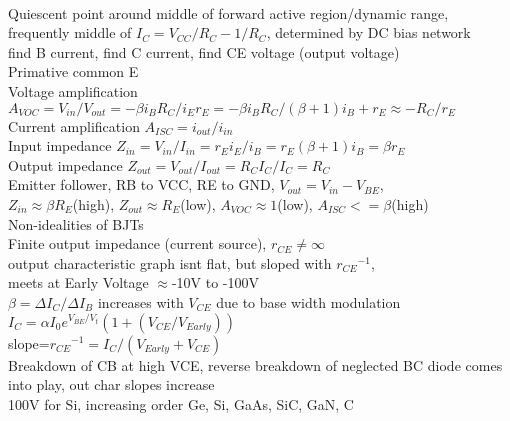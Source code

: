\documentclass{article}
\begin{document}
\begin{large}
\\Quiescent point around middle of forward active region/dynamic range, 
\\frequently middle of $I_C=V_{CC}/R_C-1/R_C$, determined by DC bias network
\\find B current, find C current, find CE voltage (output voltage)
\\Primative common E
\\Voltage amplification $A_{VOC}=V_{in}/V_{out}=-\beta i_B R_C / i_E r_E = -\beta i_B R_C / (\beta+1)i_B+r_E\approx -R_C/r_E$
\\Current amplification $A_{ISC}=i_{out}/i_{in}$
\\Input impedance $Z_{in}=V_{in}/I_{in}=r_Ei_E/i_B=r_E(\beta+1)i_B=\beta r_E$
\\Output impedance $Z_{out}=V_{out}/I_{out}=R_CI_C/I_C=R_C$
\\Emitter follower, RB to VCC, RE to GND, $V_{out}=V_{in}-V_{BE}$, 
\\$Z_{in}\approx\beta R_E$(high), $Z_{out}\approx R_E$(low), $A_{VOC}\approx 1$(low), $A_{ISC}<=\beta$(high)
\\Non-idealities of BJTs
\\Finite output impedance (current source), $r_{CE}\neq\infty$
\\output characteristic graph isnt flat, but sloped with $r_{CE}$$^{-1}$, 
\\meets at Early Voltage $\approx$-10V to -100V
\\$\beta=\Delta I_C/\Delta I_B$ increases with $V_{CE}$ due to base width modulation
\\$I_C=\alpha I_0 e^{V_{BE}/V_t} (1+(V_{CE}/V_{Early}))$
\\slope=$r_{CE}$$^{-1}=I_C/(V_{Early}+V_{CE})$
\\Breakdown of CB at high VCE, reverse breakdown of neglected BC diode comes into play, out char slopes increase
\\100V for Si, increasing order Ge, Si, GaAs, SiC, GaN, C
\newpage\end{large}
\end{document}
